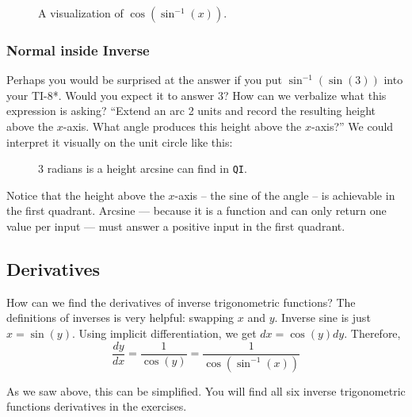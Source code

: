 \begin{figure}
\begin{centering}
\caption{A visualization of $\cos(\sin^{-1}(x))$.}
\end{centering}
\end{figure}

\subsubsection{Normal inside Inverse}
Perhaps you would be surprised at the answer if you put $\sin^{-1}(\sin(3))$ into your
TI-8*.  Would you expect it to answer 3?  How can we verbalize what this expression
is asking?  ``Extend an arc 2 units and record the resulting height above the $x$-axis.
What angle produces this height above the $x$-axis?''  We could interpret it visually
on the unit circle like this:

\begin{figure}[h]
\begin{centering}
\caption{3 radians is a height arcsine can find in \texttt{QI}.}
\end{centering}
\end{figure}

Notice that the height above the $x$-axis -- the sine of the angle -- is achievable in
the first quadrant.  Arcsine --- because it is a function and can only return one
value per input --- must answer a positive input in the first quadrant.

\subsection{Derivatives}
How can we find the derivatives of inverse trigonometric functions?  The
definitions of inverses is very helpful: swapping $x$ and $y$.  Inverse sine is just
$x=\sin(y)$.  Using implicit differentiation, we get $dx=\cos(y)dy$.  Therefore,
$$
\frac{dy}{dx} = \frac{1}{\cos(y)} = \frac{1}{\cos(\sin^{-1}(x))}
$$

As we saw above, this can be simplified.  You will find all six inverse trigonometric 
functions derivatives in the exercises.
